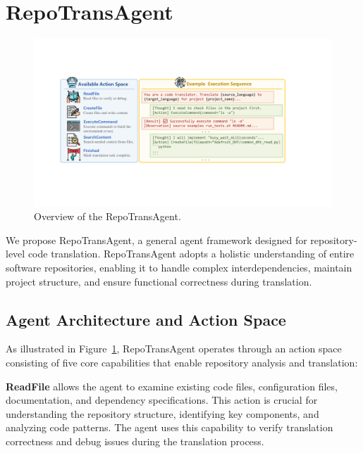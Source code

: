 \section{RepoTransAgent}


\begin{figure}
    \centering
    \includegraphics[width=0.9\linewidth]{figures/RepoTransAgent.pdf}
    \caption{Overview of the RepoTransAgent.}
    \label{fig:RepoTransAgent}
\end{figure}


We propose RepoTransAgent, a general agent framework designed for repository-level code translation. RepoTransAgent adopts a holistic understanding of entire software repositories, enabling it to handle complex interdependencies, maintain project structure, and ensure functional correctness during translation.

\subsection{Agent Architecture and Action Space}

As illustrated in Figure~\ref{fig:RepoTransAgent}, RepoTransAgent operates through an action space consisting of five core capabilities that enable repository analysis and translation:

\textbf{ReadFile} allows the agent to examine existing code files, configuration files, documentation, and dependency specifications. This action is crucial for understanding the repository structure, identifying key components, and analyzing code patterns. The agent uses this capability to verify translation correctness and debug issues during the translation process.

